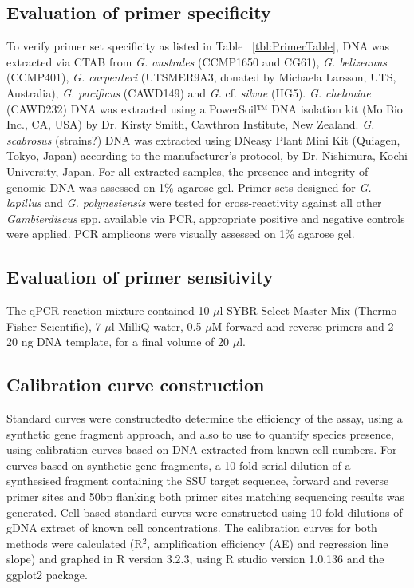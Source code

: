 \documentclass[12pt]{article}
\begin{document}
\subsection*{Evaluation of primer specificity}
To verify primer set specificity as listed in Table ~\ref{tbl:PrimerTable}, DNA was extracted via CTAB from \emph{G. australes} (CCMP1650 and CG61), \emph{G. belizeanus} (CCMP401), \emph{G. carpenteri} (UTSMER9A3, donated by Michaela Larsson, UTS, Australia), \emph{G. pacificus} (CAWD149) and \emph{G.} cf. \emph{silvae} (HG5). \emph{G. cheloniae} (CAWD232) DNA was extracted using a PowerSoil™ DNA isolation kit (Mo Bio Inc., CA, USA) by Dr. Kirsty Smith, Cawthron Institute, New Zealand. \emph{G. scabrosus} (strains?) DNA was extracted using DNeasy Plant Mini Kit (Quiagen, Tokyo, Japan) according to the manufacturer's protocol, by Dr. Nishimura, Kochi University, Japan. For all extracted samples, the presence and integrity of genomic DNA was assessed on 1\% agarose gel. Primer sets designed for \emph{G. lapillus} and \emph{G. polynesiensis} were tested for cross-reactivity against all other \emph{Gambierdiscus} spp. available via PCR, appropriate positive and negative controls were applied. PCR amplicons were visually assessed on 1\% agarose gel.


\subsection*{Evaluation of primer sensitivity}
The qPCR reaction mixture contained 10 $\mu$l SYBR Select Master Mix (Thermo Fisher Scientific), 7 $\mu$l MilliQ water, 0.5 $\mu$M forward and reverse primers and 2 - 20 ng DNA template, for a final volume of 20 $\mu$l.
\subsection*{Calibration curve construction}
Standard curves were constructedto determine the efficiency of the assay, using a synthetic gene fragment approach, and also to use to quantify species presence, using calibration curves based on DNA extracted from known cell numbers. For curves based on synthetic gene fragments, a 10-fold serial dilution of a synthesised fragment containing the SSU target sequence, forward and reverse primer sites and 50bp flanking both primer sites matching sequencing results was generated. Cell-based standard curves were constructed using 10-fold dilutions of gDNA extract of known cell concentrations.
The calibration curves for both methods were calculated (R$^{2}$, amplification efficiency (AE) and regression line slope) and graphed in R version 3.2.3, using R studio version 1.0.136 and the ggplot2 package. 
\end{document}
